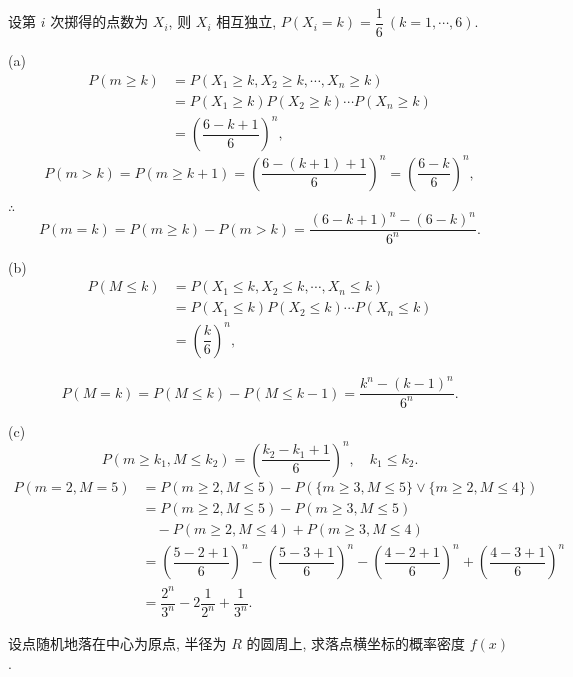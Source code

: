 \documentclass[color=black,device=normal,lang=cn]{elegantnote}
\numberwithin{equation}{section}
\theoremstyle{plain}
\numberwithin{exercise}{exsection}
\begin{document}
\begin{solution}
    设第 $i$ 次掷得的点数为 $X_i$, 则 $X_i$ 相互独立, $P(X_i=k)=\dfrac{1}{6}\ (k=1,\cdots,6)$.

    (a)
    \begin{align*}
        P(m\geq k) & =P(X_1\geq k,X_2\geq k,\cdots,X_n\geq k) \\
        & =P(X_1\geq k)P(X_2\geq k)\cdots P(X_n\geq k) \\
        & =\left(\dfrac{6-k+1}{6}\right)^n,
    \end{align*}
    \[P(m>k)=P(m\geq k+1)=\left(\dfrac{6-(k+1)+1}{6}\right)^n=\left(\dfrac{6-k}{6}\right)^n,\]
    
    $\therefore$
    \[P(m=k)=P(m\geq k)-P(m>k)=\dfrac{(6-k+1)^n-(6-k)^n}{6^n}.\]

    (b)
    \begin{align*}
        P(M\leq k) & =P(X_1\leq k,X_2\leq k,\cdots,X_n\leq k) \\
        & =P(X_1\leq k)P(X_2\leq k)\cdots P(X_n\leq k) \\
        & =\left(\dfrac{k}{6}\right)^n,
    \end{align*}

    \[P(M=k)=P(M\leq k)-P(M\leq k-1)=\dfrac{k^n-(k-1)^n}{6^n}.\]

    (c)
    \[P(m\geq k_1,M\leq k_2)=\left(\dfrac{k_2-k_1+1}{6}\right)^n,\quad k_1\leq k_2.\]
    \begin{align*}
        P(m=2,M=5) & =P(m\geq 2,M\leq 5)-P(\{m\geq 3,M\leq 5\}\vee\{m\geq 2,M\leq 4\}) \\
        & =P(m\geq 2,M\leq 5)-P(m\geq 3,M\leq 5) \\
        & \quad-P(m\geq 2,M\leq 4)+P(m\geq 3,M\leq 4) \\
        & =\left(\dfrac{5-2+1}{6}\right)^n-\left(\dfrac{5-3+1}{6}\right)^n-\left(\dfrac{4-2+1}{6}\right)^n+\left(\dfrac{4-3+1}{6}\right)^n \\
        & =\dfrac{2^n}{3^n}-2\dfrac{1}{2^n}+\dfrac{1}{3^n}.
    \end{align*}
\end{solution}
\begin{exercise}\label{ex3.26}
    设点随机地落在中心为原点, 半径为 $R$ 的圆周上, 求落点横坐标的概率密度 $f(x)$.
\end{exercise}
\end{document}
